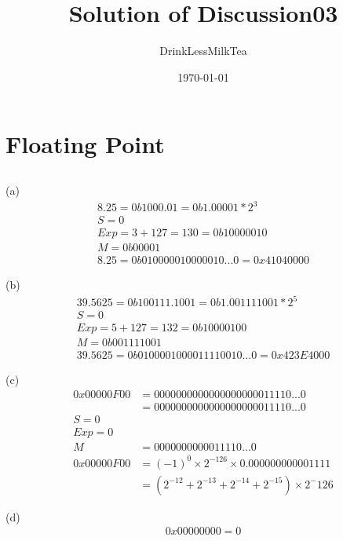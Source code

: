 \documentclass[UTF8,nofonts]{ctexart}
\title{Solution of Discussion03}
\author{DrinkLessMilkTea}
\date{\today}
\begin{document}
\maketitle
\section{Floating Point}
\subsection{}
(a)
\begin{align*}
	8.25 = 0b1000.01 = 0b1.00001 * 2^{3} \\
	S = 0                                \\
	Exp = 3 + 127 = 130 = 0b10000010     \\
	M = 0b00001                          \\
	8.25 = 0b0100 0001 0000 010...0 = 0x41040000
\end{align*}

(b)
\begin{align*}
	39.5625 = 0b100111.1001 = 0b1.001111001 * 2^5 \\
	S = 0                                         \\
	Exp = 5 + 127 = 132 = 0b10000100              \\
	M = 0b001111001                               \\
	39.5625 = 0b 0100 0010 0001 1110 010...0 = 0x423E4000
\end{align*}

(c)
\begin{align*}
	0x00000F00 & = 0000 0000 0000 0000 0000 11110...0              \\ &= 0 00000000 0000000000011110...0 \\
	S = 0                                                          \\
	Exp = 0                                                        \\
	M          & = 000 0000 0000 11110...0                         \\
	0x00000F00 & = (-1)^0 \times 2^{-126} \times 0.000000000001111 \\ &= (2^{-12}+2^{-13}+2^{-14}+2^{-15}) \times 2^-{126}
\end{align*}

(d)
\begin{align*}
	0x00000000 = 0
\end{align*}
\end{document}
